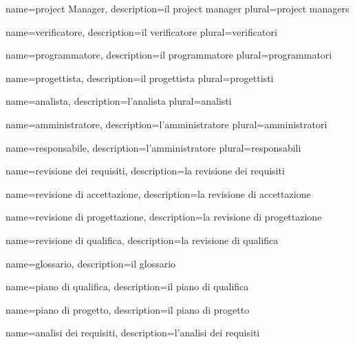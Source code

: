 \makeglossary

 {
	name=project Manager,
	description={il project manager \TODO{}}
	plural=project managers
}

 {
	name=verificatore,
	description={il verificatore \TODO{}}
	plural=verificatori
}

 {
	name=programmatore,
	description={il programmatore \TODO{}}
	plural=programmatori
}

 {
	name=progettista,
	description={il progettista \TODO{}}
	plural=progettisti
}

 {
	name=analista,
	description={l'analista \TODO{}}
	plural=analisti
}

 {
	name=amministratore,
	description={l'amministratore \TODO{}}
	plural=amministratori
}

 {
	name=responsabile,
	description={l'amministratore \TODO{}}
	plural=responsabili
}

 {
	name=revisione dei requisiti,
	description={la revisione dei requisiti \TODO{}}
}

 {
	name=revisione di accettazione,
	description={la revisione di accettazione \TODO{}}
}

 {
	name=revisione di progettazione,
	description={la revisione di progettazione \TODO{}}
}

 {
	name=revisione di qualifica,
	description={la revisione di qualifica \TODO{}}
}

 {
	name=glossario,
	description={il glossario \TODO{}}
}

 {
	name=piano di qualifica,
	description={il piano di qualifica \TODO{}}
}

 {
	name=piano di progetto,
	description={il piano di progetto \TODO{}}
}

 {
	name=analisi dei requisiti,
	description={l'analisi dei requisiti \TODO{}}
}

